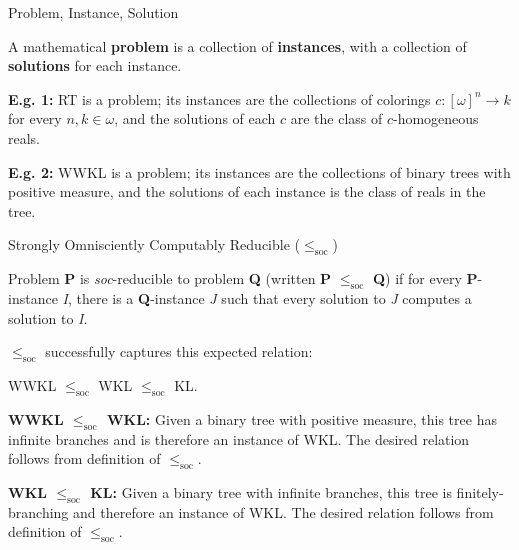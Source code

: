\begin{frame}{Problem, Instance, Solution}
  \vspace{1em}
  \begin{define*}
    A mathematical \textbf{problem} is a collection of \textbf{instances},
    with a collection of \textbf{solutions} for each instance.
  \end{define*}

  \vspace{1em}
  \textbf{E.g. 1:} RT is a problem; its instances are the collections of
  colorings $c:[\omega]^n\rightarrow k$ for every $n,k\in\omega$, and the
  solutions of each $c$ are the class of $c$-homogeneous reals.

  \vspace{1em}
  \textbf{E.g. 2:} WWKL is a problem; its instances are the collections of
  binary trees with positive measure, and the solutions of each instance is
  the class of reals in the tree.
\end{frame}

\begin{frame}{Strongly Omnisciently Computably Reducible
($\leq_{\text{soc}}$)}
  \begin{define*}
    Problem \textbf{P} is \textit{soc}-reducible to problem \textbf{Q}
    (written \textbf{P} $\leq_{\text{soc}}$ \textbf{Q}) if for every
    \textbf{P}-instance \textit{I}, there is a \textbf{Q}-instance
    \textit{J} such that every solution to \textit{J} computes a solution
    to \textit{I}.
  \end{define*}

  $\leq_{\text{soc}}$ successfully captures this expected relation:
  \begin{center}
    WWKL $\leq_{\text{soc}}$ WKL $\leq_{\text{soc}}$ KL.
  \end{center}

  \vspace{0.5em}
  \textbf{WWKL $\leq_{\text{soc}}$ WKL:} Given a binary tree with
  positive measure, this tree has infinite branches and is therefore an
  instance of WKL. The desired relation follows from definition of
  $\leq_{\text{soc}}$.

  \vspace{0.5em}
  \textbf{WKL $\leq_{\text{soc}}$ KL:} Given a binary tree with infinite
  branches, this tree is finitely-branching and therefore an instance of
  WKL. The desired relation follows from definition of $\leq_{\text{soc}}$.
\end{frame}

